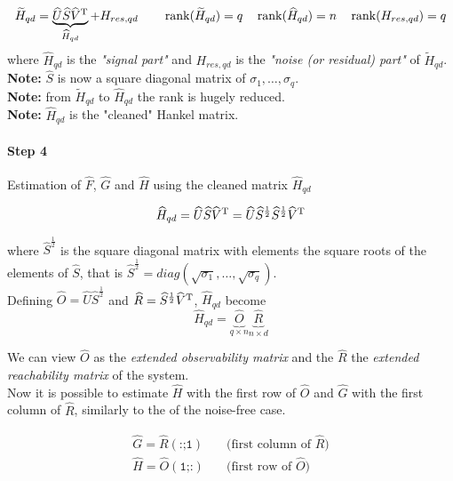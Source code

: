 \[
    \widetilde{H}_{qd} = \underbrace{\widehat{U} \widehat{S} \widehat{V}^{\mathrm{T}}}_{\widehat{H}_{qd}} + H_{res,qd} \qquad \operatorname*{rank} (\widetilde{H}_{qd}) = q \quad \operatorname*{rank} (\widehat{H}_{qd}) = n \quad \operatorname*{rank} (H_{res,qd}) = q
\]
where $\hat{H}_{qd}$ is the \emph{"signal part"} and $H_{res,qd}$ is the \emph{"noise (or residual) part"} of $\tilde{H}_{qd}$.\\

\textbf{Note:} $\hat{S}$ is now a square diagonal matrix of $\sigma_1, \dots, \sigma_q$.\\
\textbf{Note:} from $\tilde{H}_{qd}$ to $\hat{H}_{qd}$ the rank is hugely reduced.\\
\textbf{Note:} $\hat{H}_{qd}$ is the "cleaned" Hankel matrix.

\paragraph{Step 4} Estimation of $\hat{F}$, $\hat{G}$ and $\hat{H}$ using the cleaned matrix $\hat{H}_{qd}$

\[
    \widehat{H}_{qd} = \widehat{U} \widehat{S} \widehat{V}^{\mathrm{T}} = \widehat{U} \widehat{S}^{\frac{1}{2}} \widehat{S}^{\frac{1}{2}} \widehat{V}^{\mathrm{T}}
\]

where $\hat{S}^{\frac{1}{2}}$ is the square diagonal matrix with elements the square roots of the elements of $\hat{S}$, that is $\hat{S}^{\frac{1}{2}}=diag(\sqrt{\sigma_1}, \dots, \sqrt{\sigma_q})$. \\

Defining $\hat{O} = \hat{U}\hat{S}^{\frac{1}{2}}$ and $\widehat{R} = \widehat{S}^{\frac{1}{2}} \widehat{V}^{\mathrm{T}}$, $\hat{H}_{qd}$ become 
\[\hat{H}_{qd} = \underbrace{\hat{O}}_{q\times n} \underbrace{\hat{R}}_{n\times d}\]


We can view $\hat{O}$ as the \emph{extended observability matrix} and the $\hat{R}$ the \emph{extended reachability matrix} of the system. \\

Now it is possible to estimate $\hat{H}$ with the first row of $\hat{O}$ and $\hat{G}$ with the first column of $\hat{R}$, similarly to the  of the noise-free case.

\begin{align*}
    \hat{G} = \hat{R}(\texttt{:;1}) & \quad\text{(first column of $\hat{R}$)} \\
    \hat{H} = \hat{O}(\texttt{1;:}) & \quad\text{(first row of $\hat{O}$)} \\
\end{align*}



